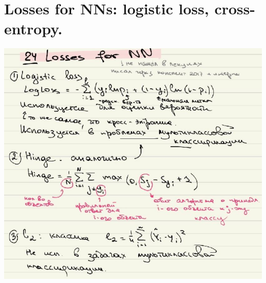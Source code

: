 \section{Losses for NNs: logistic loss, cross-entropy.}
\includegraphics[]{images/24.JPG}
\newpage

